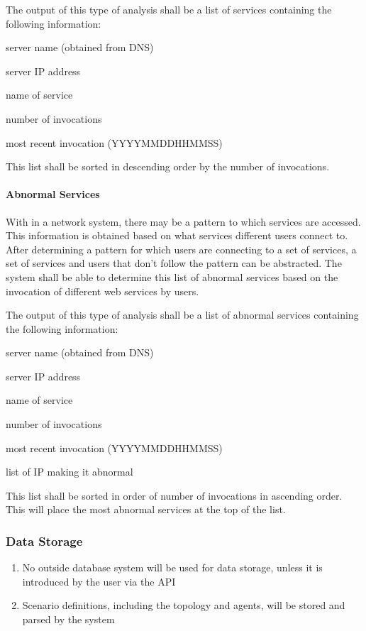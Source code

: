 \documentclass[titlepage]{article}
\begin{document}
The output of this type of analysis shall be a list of services containing the
following information:
\begin{itemize*}
    \item server name (obtained from DNS)
    \item server IP address
    \item name of service
    \item number of invocations
    \item most recent invocation (YYYYMMDDHHMMSS)
\end{itemize*}
This list shall be sorted in descending order by the number of invocations.

\paragraph{Abnormal Services} 
With in a network system, there may be a pattern to which services are
accessed. This information is obtained based on what services different users
connect to. After determining a pattern for which users are connecting to a set
of services, a set of services and users that don't follow the pattern can be
abstracted. The system shall be able to determine this list of abnormal
services based on the invocation of different web services by users.
            
The output of this type of analysis shall be a list of abnormal services
containing the following information:
\begin{itemize*}
    \item server name (obtained from DNS)
    \item server IP address
    \item name of service
    \item number of invocations
    \item most recent invocation (YYYYMMDDHHMMSS)
    \item list of IP making it abnormal
\end{itemize*}
This list shall be sorted in order of number of invocations in ascending order.
This will place the most abnormal services at the top of the list.


\subsubsection{Data Storage%
  \label{data-storage}%
}
  \begin{enumerate}
    \item No outside database system will be used for data storage, unless it is introduced by the user via the API
    \item Scenario definitions, including the topology and agents, will be stored and parsed by the system
  \end{enumerate}
\end{document}
